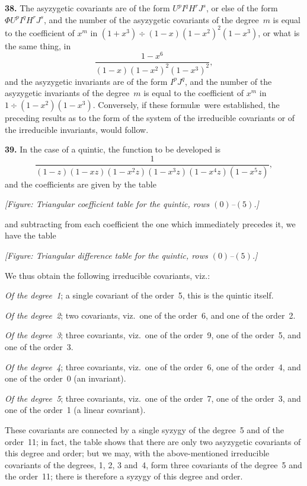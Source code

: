 \documentclass[11pt]{article}
\begin{document}
\textbf{38.} The asyzygetic covariants are of the form $U^p I^q H^r J^s$, or else of the form $\Phi U^p I^q H^r J^s$, and the number of the asyzygetic covariants of the degree~$m$ is equal to the coefficient of $x^m$ in $(1 + x^3)\div(1-x)(1-x^2)^2(1-x^3)$, or what is the same thing, in
\[
\frac{1-x^6}{(1-x)(1-x^2)^2(1-x^3)^2},
\]
and the asyzygetic invariants are of the form $I^p J^q$, and the number of the asyzygetic invariants of the degree~$m$ is equal to the coefficient of $x^m$ in $1\div(1-x^2)(1-x^3)$. Conversely, if these formul\ae\ were established, the preceding results as to the form of the system of the irreducible covariants or of the irreducible invariants, would follow.

\textbf{39.} In the case of a quintic, the function to be developed is
\[
\frac{1}{(1-z)(1-xz)(1-x^2 z)(1-x^3 z)(1-x^4 z)(1-x^5 z)},
\]
and the coefficients are given by the table

\medskip
\noindent\textit{[Figure: Triangular coefficient table for the quintic, rows $(0)$--$(5)$.]}

and subtracting from each coefficient the one which immediately precedes it, we have the table

\medskip
\noindent\textit{[Figure: Triangular difference table for the quintic, rows $(0)$--$(5)$.]}

We thus obtain the following irreducible covariants, viz.:

\textit{Of the degree~1}; a single covariant of the order~5, this is the quintic itself.

\textit{Of the degree~2}; two covariants, viz.\ one of the order~6, and one of the order~2.

\textit{Of the degree~3}; three covariants, viz.\ one of the order~9, one of the order~5, and one of the order~3.

\textit{Of the degree~4}; three covariants, viz.\ one of the order~6, one of the order~4, and one of the order~0 (an invariant).

\textit{Of the degree~5}; three covariants, viz.\ one of the order~7, one of the order~3, and one of the order~1 (a linear covariant).

These covariants are connected by a single syzygy of the degree~5 and of the order~11; in fact, the table shows that there are only two asyzygetic covariants of this degree and order; but we may, with the above-mentioned irreducible covariants of the degrees, 1, 2, 3 and~4, form three covariants of the degree~5 and the order~11; there is therefore a syzygy of this degree and order.
\end{document}
